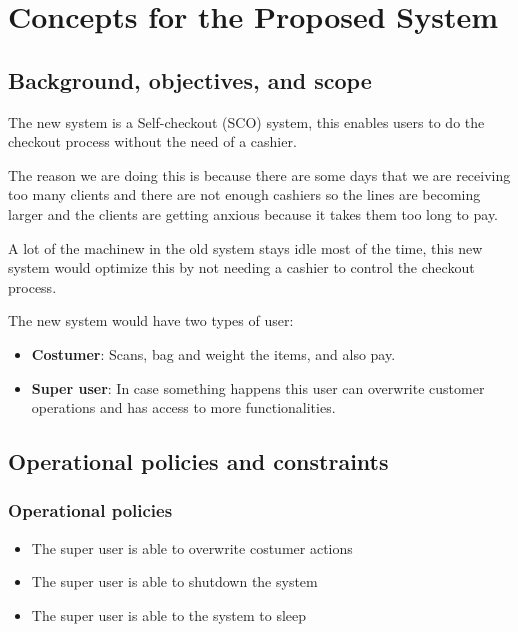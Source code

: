 \section{Concepts for the Proposed System}

\subsection{Background, objectives, and scope}

The new system is a Self-checkout (SCO) system, this enables users to do 
the checkout process without the need of a cashier. \newline

The reason we are doing this is because there are some days that we are 
receiving too many clients and there are not enough cashiers so the lines are 
becoming larger and the clients are getting anxious because it takes them 
too long to pay. \newline

A lot of the machinew in the old system stays idle most of the time, this new 
system would optimize this by not needing a cashier to control the 
checkout process. \newline

The new system would have two types of user:
\begin{itemize}
	\item \textbf{Costumer}: Scans, bag and weight the items, and also pay.
	\item \textbf{Super user}: In case something happens this user can 
    overwrite customer operations and has access to more functionalities.
\end{itemize}

\subsection{Operational policies and constraints}

\subsubsection{Operational policies}
\begin{itemize}
    \item The super user is able to overwrite costumer actions
    \item The super user is able to shutdown the system
    \item The super user is able to the system to sleep
\end{itemize}

